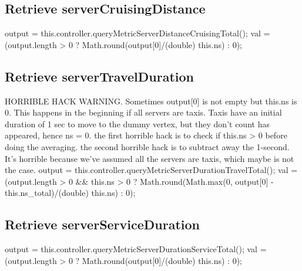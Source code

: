 \subsection{Retrieve serverCruisingDistance}
\nwenddocs{}\endmoddef{}
output = this.controller.queryMetricServerDistanceCruisingTotal();
val = (output.length > 0 ? Math.round(output[0]/(double) this.ns) : 0);
\nwendcode{}\nwdocspar

\subsection{Retrieve serverTravelDuration}
HORRIBLE HACK WARNING. Sometimes output[0] is not empty but this.ns is 0. This
happens in the beginning if all servers are taxis. Taxis have an initial
duration of 1 sec to move to the dummy vertex, but they don't count has
appeared, hence ns = 0. the first horrible hack is to check if this.ns > 0
before doing the averaging. the second horrible hack is to subtract away the
1-second. It's horrible because we've assumed all the servers are taxis, which
maybe is not the case.
\nwenddocs{}\endmoddef{}
output = this.controller.queryMetricServerDurationTravelTotal();
val = (output.length > 0 && this.ns > 0
    ? Math.round(Math.max(0, output[0] - this.ns_total)/(double) this.ns) : 0);
\nwendcode{}\nwdocspar

\subsection{Retrieve serverServiceDuration}
\nwenddocs{}\endmoddef{}
output = this.controller.queryMetricServerDurationServiceTotal();
val = (output.length > 0 ? Math.round(output[0]/(double) this.ns) : 0);
\nwendcode{}\nwdocspar

